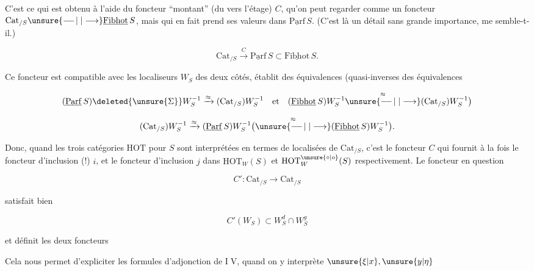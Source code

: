 
C'est ce qui est obtenu à l'aide du foncteur ``montant'' (du  vers l'étage) $C$, qu'on peut regarder comme un foncteur $\mathrm{Cat}_{/S}\unsure{\mathrel{\relbar\joinrel\relbar\joinrel\vert}|\longrightarrow}\underline{\mathrm{Fibhot}}\,S$, mais qui en fait prend ses valeurs dans $\underline{\mathrm{Parf}}\,S$. (C'est là un détail sans grande importance, me semble-t-il.)

\[
\mathrm{Cat}_{/S}\xrightarrow{C}\underline{\mathrm{Parf}}\,S\subset\underline{\mathrm{Fibhot}}\,S.
\]

Ce foncteur  est compatible avec les localiseurs $W_S$ des deux côtés,   établit des équivalences (quasi-inverses des équivalences

\[
(\underline{\mathrm{Parf}}\,S)\deleted{\unsure{\Sigma}}W_S^{-1}\xrightarrow{\approx}(\mathrm{Cat}_{/S})W_S^{-1}
\quad\text{et}\quad
(\underline{\mathrm{Fibhot}}\,S)W_S^{-1}\overset{\approx}{\unsure{\mathrel{\relbar\joinrel\relbar\joinrel\vert}|\longrightarrow}}(\mathrm{Cat}_{/S})W_S^{-1}\bigr)
\]

\[
(\mathrm{Cat}_{/S})W_S^{-1}\xrightarrow{\approx}(\underline{\mathrm{Parf}}\,S)W_S^{-1}
\bigl(\overset{\approx}{\unsure{\mathrel{\relbar\joinrel\relbar\joinrel\vert}|\longrightarrow}}(\underline{\mathrm{Fibhot}}\,S)W_S^{-1}\bigr).
\]

Donc, quand les trois catégories $\mathrm{HOT}$ pour $S$ sont interprétées en termes de localisées de $\mathrm{Cat}_{/S}$, c'est le foncteur $C$  qui fournit à la fois le foncteur d'inclusion (!) $i$, et le foncteur d'inclusion $j$ dans $\mathrm{HOT}_{W}(S)$ et $\mathrm{HOT}_{W}^{\unsure{\circ|o}}(S)$ respectivement. Le foncteur en question

\[
C':\mathrm{Cat}_{/S}\longrightarrow\mathrm{Cat}_{/S}
\]

satisfait bien

\[
C'(W_S)\subset W_S^d\cap W_S^g
\]

et définit les deux foncteurs


Cela nous permet d'expliciter les formules d'adjonction de \textcircled{IV}, quand on y interprète $\unsure{\xi|x},\unsure{y|\eta}$
